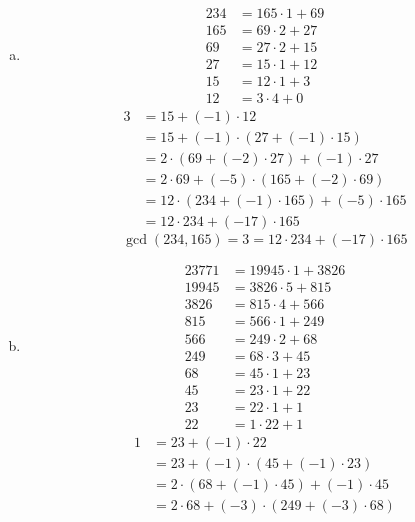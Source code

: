 \documentclass[a4paper,11pt,twocolumn]{article}
\begin{document}
\begin{enumerate}[(a)]
    \item
        \begin{align*}
          234 &= 165 \cdot 1 + 69 \\
          165 &= 69 \cdot 2 + 27 \\
          69 &= 27 \cdot 2 + 15 \\
          27 &= 15 \cdot 1 + 12 \\
          15 &= 12 \cdot 1 + 3 \\
          12 &= 3 \cdot 4 + 0
        \end{align*}
        \begin{align*}
          3 &= 15 + (-1) \cdot 12 \\
            &= 15 + (-1) \cdot (27 + (-1) \cdot 15) \\
            &= 2 \cdot (69 + (-2) \cdot 27) + (-1) \cdot 27 \\
            &= 2 \cdot 69 + (-5) \cdot (165 + (-2) \cdot 69) \\
            &= 12 \cdot (234 + (-1) \cdot 165) + (-5) \cdot 165 \\
            &= 12 \cdot 234 + (-17) \cdot 165
        \end{align*}
        $$ \gcd(234, 165) = 3 = 12 \cdot 234 + (-17) \cdot 165 $$
    \item
        \begin{align*}
          23771 &= 19945 \cdot 1 + 3826 \\
          19945 &= 3826 \cdot 5 + 815 \\
          3826 &= 815 \cdot 4 + 566 \\
          815 &= 566 \cdot 1 + 249 \\
          566 &= 249 \cdot 2 + 68 \\
          249 &= 68 \cdot 3 + 45 \\
          68 &= 45 \cdot 1 + 23 \\
          45 &= 23 \cdot 1 + 22 \\
          23 &= 22 \cdot 1 + 1 \\
          22 &= 1 \cdot 22 + 1
        \end{align*}
        \begin{align*}
          1 &= 23 + (-1) \cdot 22 \\
            &= 23 + (-1) \cdot (45 + (-1) \cdot 23) \\
            &= 2 \cdot (68 + (-1) \cdot 45) + (-1) \cdot 45 \\
            &= 2 \cdot 68 + (-3) \cdot (249 + (-3) \cdot 68) \\

\end{align*}
\end{enumerate}
\end{document}

